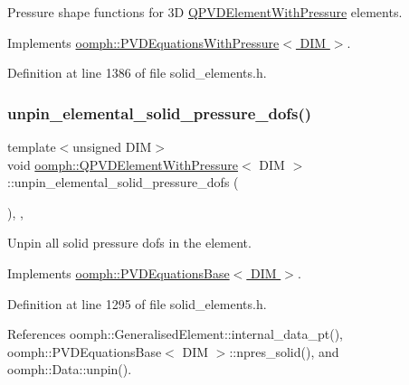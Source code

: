 Pressure shape functions for 3D \hyperlink{classoomph_1_1QPVDElementWithPressure}{Q\+P\+V\+D\+Element\+With\+Pressure} elements. 



Implements \hyperlink{classoomph_1_1PVDEquationsWithPressure_ad580f7919412f6b574b76f514f56282c}{oomph\+::\+P\+V\+D\+Equations\+With\+Pressure$<$ D\+I\+M $>$}.



Definition at line 1386 of file solid\+\_\+elements.\+h.

\mbox{\label{classoomph_1_1QPVDElementWithPressure_adf9446eb7ed36b39e881d03f006290f8}} 
\subsubsection{\texorpdfstring{unpin\+\_\+elemental\+\_\+solid\+\_\+pressure\+\_\+dofs()}{unpin\_elemental\_solid\_pressure\_dofs()}}
{\footnotesize\ttfamily template$<$unsigned D\+IM$>$ \\
void \hyperlink{classoomph_1_1QPVDElementWithPressure}{oomph\+::\+Q\+P\+V\+D\+Element\+With\+Pressure}$<$ D\+IM $>$\+::unpin\+\_\+elemental\+\_\+solid\+\_\+pressure\+\_\+dofs (\begin{DoxyParamCaption}{ }\end{DoxyParamCaption})\hspace{0.3cm}{\ttfamily [inline]}, {\ttfamily [private]}, {\ttfamily [virtual]}}



Unpin all solid pressure dofs in the element. 



Implements \hyperlink{classoomph_1_1PVDEquationsBase_abd9064a8651728806dda27636b1e5b50}{oomph\+::\+P\+V\+D\+Equations\+Base$<$ D\+I\+M $>$}.



Definition at line 1295 of file solid\+\_\+elements.\+h.



References oomph\+::\+Generalised\+Element\+::internal\+\_\+data\+\_\+pt(), oomph\+::\+P\+V\+D\+Equations\+Base$<$ D\+I\+M $>$\+::npres\+\_\+solid(), and oomph\+::\+Data\+::unpin().



